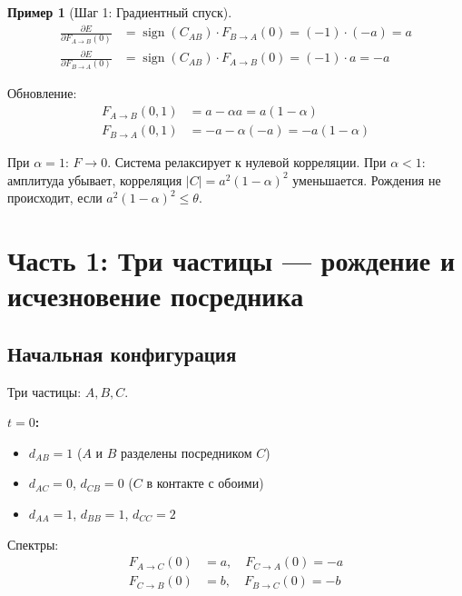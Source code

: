 \documentclass[11pt,a4paper]{article}
\theoremstyle{definition}
\newtheorem{example}{Пример}[section]
\begin{document}
\begin{example}[Шаг 1: Градиентный спуск]
\begin{align}
    \frac{\partial E}{\partial F_{A \to B}(0)} &= \operatorname{sign}(C_{AB}) \cdot F_{B \to A}(0) = (-1) \cdot (-a) = a \\
    \frac{\partial E}{\partial F_{B \to A}(0)} &= \operatorname{sign}(C_{AB}) \cdot F_{A \to B}(0) = (-1) \cdot a = -a
\end{align}

Обновление:
\begin{align}
    F_{A \to B}(0, 1) &= a - \alpha a = a(1 - \alpha) \\
    F_{B \to A}(0, 1) &= -a - \alpha(-a) = -a(1 - \alpha)
\end{align}

При $\alpha = 1$: $F \to 0$. Система релаксирует к нулевой корреляции.
При $\alpha < 1$: амплитуда убывает, корреляция $|C| = a^2(1-\alpha)^2$ уменьшается.
Рождения не происходит, если $a^2(1-\alpha)^2 \leq \theta$.
\end{example}

\newpage
\section{Часть 1: Три частицы --- рождение и исчезновение посредника}

\subsection{Начальная конфигурация}

Три частицы: $A, B, C$.

\textbf{$t = 0$:}
\begin{itemize}
    \item $d_{AB} = 1$ ($A$ и $B$ разделены посредником $C$)
    \item $d_{AC} = 0$, $d_{CB} = 0$ ($C$ в контакте с обоими)
    \item $d_{AA} = 1$, $d_{BB} = 1$, $d_{CC} = 2$
\end{itemize}

Спектры:
\begin{align}
    F_{A \to C}(0) &= a, \quad F_{C \to A}(0) = -a \\
    F_{C \to B}(0) &= b, \quad F_{B \to C}(0) = -b
\end{align}
\end{document}
